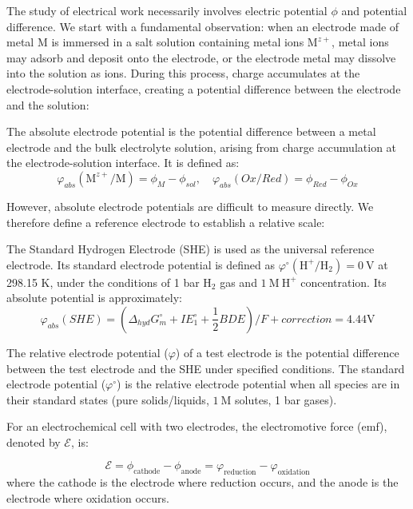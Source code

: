The study of electrical work necessarily involves electric potential $\phi$ and potential difference. We start with a fundamental observation: when an electrode made of metal M is immersed in a salt solution containing metal ions $\text{M}^{z+}$, metal ions may adsorb and deposit onto the electrode, or the electrode metal may dissolve into the solution as ions. During this process, charge accumulates at the electrode-solution interface, creating a potential difference between the electrode and the solution:

\begin{definition}
The absolute electrode potential is the potential difference between a metal electrode and the bulk electrolyte solution, arising from charge accumulation at the electrode-solution interface. It is defined as:
$$\varphi_{abs}(\text{M}^{z+}/\text{M})=\phi_M - \phi_{sol}, \quad \varphi_{abs}(Ox/Red) = \phi_{Red} - \phi_{Ox} $$
\end{definition}

However, absolute electrode potentials are difficult to measure directly. We therefore define a reference electrode to establish a relative scale:

\begin{definition}
The Standard Hydrogen Electrode (SHE) is used as the universal reference electrode. Its standard electrode potential is defined as $\varphi^\circ(\text{H}^+/\text{H}_2) = 0\ \mathrm{V}$ at 298.15 K, under the conditions of 1 bar $\text{H}_2$ gas and $1\ \mathrm{M}\ \text{H}^+$ concentration. Its absolute potential is approximately:
$$\varphi_{abs}(SHE) = (\varDelta_{hyd}G_m^\circ + IE_1^\circ +\frac{1}{2}BDE)/F + correction = 4.44\text{V}$$

The relative electrode potential ($\varphi$) of a test electrode is the potential difference between the test electrode and the SHE under specified conditions. The standard electrode potential ($\varphi^\circ$) is the relative electrode potential when all species are in their standard states (pure solids/liquids, $1\ \mathrm{M}$ solutes, 1 bar gases).
\end{definition}

For an electrochemical cell with two electrodes, the electromotive force (emf), denoted by $\mathcal{E}$, is:

\begin{proposition}
$$\mathcal{E} = \phi_{\text{cathode}} - \phi_{\text{anode}} = \varphi_{\text{reduction}} - \varphi_{\text{oxidation}}$$
where the cathode is the electrode where reduction occurs, and the anode is the electrode where oxidation occurs.
\end{proposition}


